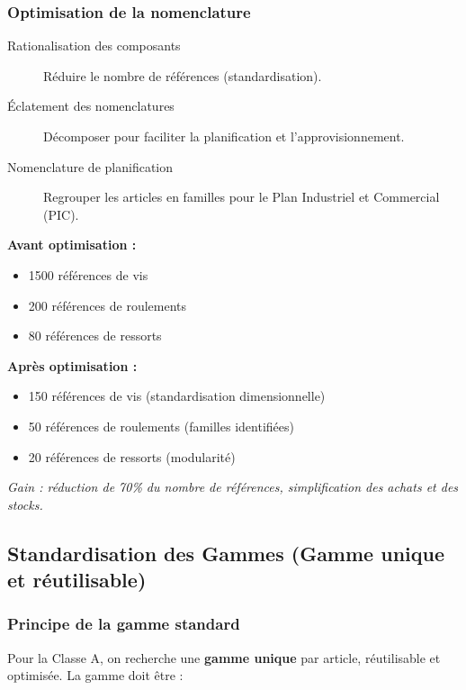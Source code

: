 \documentclass{article}
\begin{document}
\subsubsection{Optimisation de la nomenclature}

\begin{description}
    \item[Rationalisation des composants] Réduire le nombre de références (standardisation).
    \item[Éclatement des nomenclatures] Décomposer pour faciliter la planification et l'approvisionnement.
    \item[Nomenclature de planification] Regrouper les articles en familles pour le Plan Industriel et Commercial (PIC).
\end{description}

\begin{tcolorbox}[colback=yellow!10!white, colframe=yellow!50!black, title=Exemple : Optimisation par standardisation]
\textbf{Avant optimisation :}
\begin{itemize}
    \item 1500 références de vis
    \item 200 références de roulements
    \item 80 références de ressorts
\end{itemize}
\vspace{0.5em}
\textbf{Après optimisation :}
\begin{itemize}
    \item 150 références de vis (standardisation dimensionnelle)
    \item 50 références de roulements (familles identifiées)
    \item 20 références de ressorts (modularité)
\end{itemize}
\textit{Gain : réduction de 70\% du nombre de références, simplification des achats et des stocks.}
\end{tcolorbox}

\subsection{Standardisation des Gammes (Gamme unique et réutilisable)}

\subsubsection{Principe de la gamme standard}

Pour la Classe A, on recherche une \textbf{gamme unique} par article, réutilisable et optimisée. La gamme doit être :
\end{document}

